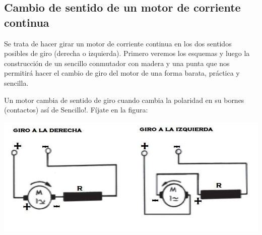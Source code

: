 \documentclass[12pt,a4paper]{article}
\begin{document}
\begin{flushleft}
\section {Cambio de sentido de un motor de corriente continua}
Se trata de hacer girar un motor de corriente continua en los dos sentidos posibles de giro (derecha o izquierda). Primero veremos los esquemas y luego la construcción de un sencillo conmutador con madera y una punta que nos permitirá hacer el cambio de giro del motor de una forma barata, práctica y sencilla.

 Un motor cambia de sentido de giro cuando cambia la polaridad en su bornes (contactos) así de Sencillo!. Fíjate en la figura:
\end{flushleft}
\begin{center}
\includegraphics[scale=.5]{imagenes/1ETAPA.JPG} \linebreak
\end{center}
\end{document}
